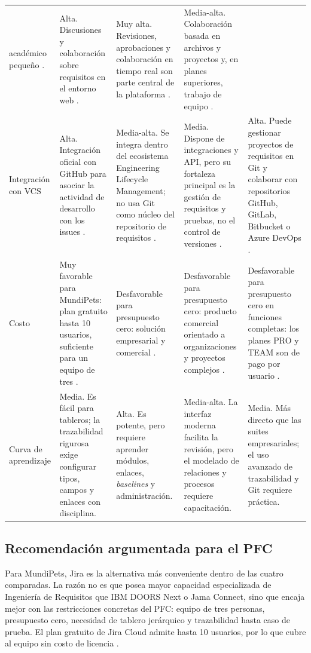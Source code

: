 \documentclass[journal,onecolumn]{IEEEtran}
\begin{document}
\begin{longtable}{L{1.9cm} L{2.9cm} L{2.9cm} L{2.9cm} L{2.9cm}}
		académico pequeño \cite{atlassian2026}. &
		Alta. Discusiones y colaboración sobre requisitos en el entorno web \cite{ibmdoors2026}. &
		Muy alta. Revisiones, aprobaciones y colaboración en tiempo real son parte central de la
		plataforma \cite{jama2026}. &
		Media-alta. Colaboración basada en archivos y proyectos y, en planes superiores, trabajo de
		equipo \cite{reqview2026}. \\
		\addlinespace
		Integración con VCS &
		Alta. Integración oficial con GitHub para asociar la actividad de desarrollo con los issues
		\cite{atlassian2026}. &
		Media-alta. Se integra dentro del ecosistema Engineering Lifecycle Management; no usa Git como
		núcleo del repositorio de requisitos \cite{ibmdoors2026}. &
		Media. Dispone de integraciones y API, pero su fortaleza principal es la gestión de requisitos
		y pruebas, no el control de versiones \cite{jama2026}. &
		Alta. Puede gestionar proyectos de requisitos en Git y colaborar con repositorios GitHub,
		GitLab, Bitbucket o Azure DevOps \cite{reqview2026}. \\
		\addlinespace
		Costo &
		Muy favorable para MundiPets: plan gratuito hasta 10 usuarios, suficiente para un equipo de
		tres \cite{atlassian2026}. &
		Desfavorable para presupuesto cero: solución empresarial y comercial \cite{ibmdoors2026}. &
		Desfavorable para presupuesto cero: producto comercial orientado a organizaciones y proyectos
		complejos \cite{jama2026}. &
		Desfavorable para presupuesto cero en funciones completas: los planes PRO y TEAM son de pago
		por usuario \cite{reqview2026}. \\
		\addlinespace
		Curva de aprendizaje &
		Media. Es fácil para tableros; la trazabilidad rigurosa exige configurar tipos, campos y
		enlaces con disciplina. &
		Alta. Es potente, pero requiere aprender módulos, enlaces, \emph{baselines} y
		administración. &
		Media-alta. La interfaz moderna facilita la revisión, pero el modelado de relaciones y
		procesos requiere capacitación. &
		Media. Más directo que las suites empresariales; el uso avanzado de trazabilidad y Git
		requiere práctica. \\
	\end{longtable}
	
	\subsection{Recomendación argumentada para el PFC}
	\label{sec:recomendacion}
	
	Para MundiPets, Jira es la alternativa más conveniente dentro de las cuatro comparadas. La razón
	no es que posea mayor capacidad especializada de Ingeniería de Requisitos que IBM DOORS Next o
	Jama Connect, sino que encaja mejor con las restricciones concretas del PFC: equipo de tres
	personas, presupuesto cero, necesidad de tablero jerárquico y trazabilidad hasta caso de prueba.
	El plan gratuito de Jira Cloud admite hasta 10 usuarios, por lo que cubre al equipo sin costo de
	licencia \cite{atlassian2026}.
	
\end{document}
